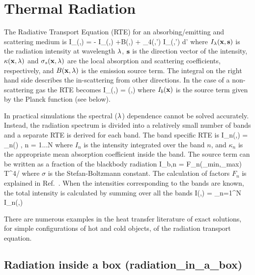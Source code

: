\documentclass[11pt]{book}
\begin{document}
\chapter{Thermal Radiation}

The Radiative Transport Equation (RTE) for an absorbing/emitting
and scattering medium is
\be \bs \cdot \nabla I_{\la}(\bx,\bs) =
 - \;
I_\la(\bx,\bs) +B(\bx,\la) + 
\int_{4\pi}\Phi(\bs,\bs') \; I_{\la}(\bx,\bs') \; d\bs'
\label{RTEbasic} \ee
where $I_{\lambda}({\bf x},{\bf s})$ is the radiation intensity at wavelength
$\lambda$, ${\bf s}$ is the direction vector of the intensity,
$\kappa({\bf x},\lambda)$ and $\sigma_s({\bf x},\lambda)$ are the local absorption
and scattering coefficients,
respectively, and $B({\bf x},\lambda)$ is the emission source term.
The integral on the
right hand side describes the in-scattering from other directions.
In the case of a non-scattering gas the RTE becomes
\be \bs \cdot \nabla I_{\la}(\bx,\bs) = \kappa(\bx,\la) \; \Big[ I_b(\bx)
- I_\la(\bx,\bs) \Big] \label{RTE} \ee
where $I_b({\bf x})$ is the source term given by the Planck function (see below).

In practical simulations the spectral ($\lambda$) dependence cannot be solved
accurately. Instead, the radiation spectrum is divided into
a relatively small number of bands and a separate RTE is derived for
each band. The band specific RTE is
\be   \bs \cdot \nabla I_n(\bx,\bs) = \kappa_n(\bx) \;
        \left[ I_{b,n}(\bx) - I_n(\bx,\bs) \right],\;\; n = 1...N
\label{bandRTE} \ee
where $I_n$ is the intensity integrated over the band $n$, and $\kappa_n$
is the appropriate mean absorption coefficient inside the band. The
source term can be written as a fraction of the blackbody radiation
\be I_{b,n} = F_n(\la_{\rm min},\la_{\rm max}) \; \sigma \; T^4/\pi \ee
where $\sigma$ is the Stefan-Boltzmann constant.
The calculation of factors $F_n$ is explained in Ref.~\cite{Siegel:1}.
When the intensities corresponding to the bands are known, the total
intensity is calculated by summing over all the bands
\be I(\bx,\bs) = \sum_{n=1}^N I_n(\bx,\bs) \ee

There are numerous examples in the heat transfer literature of exact solutions, for simple configurations of hot and cold objects, of the radiation
transport equation.

\clearpage

\section{Radiation inside a box (\texorpdfstring{{\bf radiation\_in\_a\_box}}{radiation\_in\_a\_box}) }
\label{radiation_in_a_box}
\end{document}
